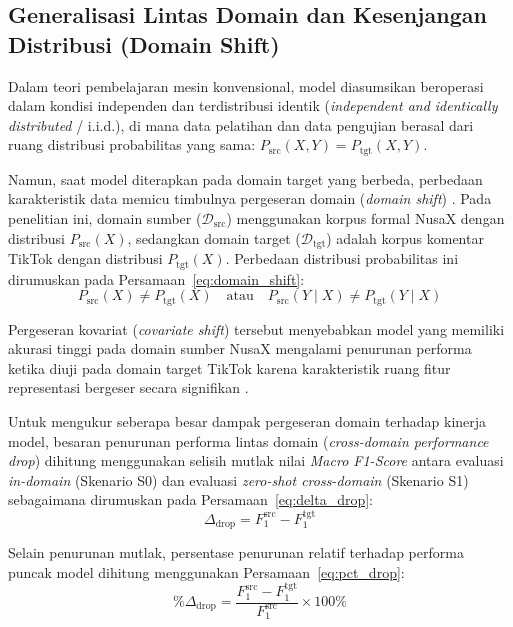 \subsection{Generalisasi Lintas Domain dan Kesenjangan Distribusi (Domain Shift)}

Dalam teori pembelajaran mesin konvensional, model diasumsikan beroperasi dalam kondisi independen dan terdistribusi identik (\textit{independent and identically distributed} / i.i.d.), di mana data pelatihan dan data pengujian berasal dari ruang distribusi probabilitas yang sama: $P_{\text{src}}(X, Y) = P_{\text{tgt}}(X, Y)$.

Namun, saat model diterapkan pada domain target yang berbeda, perbedaan karakteristik data memicu timbulnya pergeseran domain (\textit{domain shift}) \citep{aribowo2021cross, zulkifli2025indonesian}. Pada penelitian ini, domain sumber ($\mathcal{D}_{\text{src}}$) menggunakan korpus formal NusaX dengan distribusi $P_{\text{src}}(X)$, sedangkan domain target ($\mathcal{D}_{\text{tgt}}$) adalah korpus komentar TikTok dengan distribusi $P_{\text{tgt}}(X)$. Perbedaan distribusi probabilitas ini dirumuskan pada Persamaan~\eqref{eq:domain_shift}:
\begin{equation}
\label{eq:domain_shift}
P_{\text{src}}(X) \neq P_{\text{tgt}}(X) \quad \text{atau} \quad P_{\text{src}}(Y \mid X) \neq P_{\text{tgt}}(Y \mid X)
\end{equation}

Pergeseran kovariat (\textit{covariate shift}) tersebut menyebabkan model yang memiliki akurasi tinggi pada domain sumber NusaX mengalami penurunan performa ketika diuji pada domain target TikTok karena karakteristik ruang fitur representasi bergeser secara signifikan \citep{aribowo2021cross, zulkifli2025indonesian}.

Untuk mengukur seberapa besar dampak pergeseran domain terhadap kinerja model, besaran penurunan performa lintas domain (\textit{cross-domain performance drop}) dihitung menggunakan selisih mutlak nilai \textit{Macro F1-Score} antara evaluasi \textit{in-domain} (Skenario S0) dan evaluasi \textit{zero-shot cross-domain} (Skenario S1) sebagaimana dirumuskan pada Persamaan~\eqref{eq:delta_drop}:
\begin{equation}
\label{eq:delta_drop}
\Delta_{\text{drop}} = F_1^{\text{src}} - F_1^{\text{tgt}}
\end{equation}

Selain penurunan mutlak, persentase penurunan relatif terhadap performa puncak model dihitung menggunakan Persamaan~\eqref{eq:pct_drop}:
\begin{equation}
\label{eq:pct_drop}
\%\Delta_{\text{drop}} = \frac{F_1^{\text{src}} - F_1^{\text{tgt}}}{F_1^{\text{src}}} \times 100\%
\end{equation}

